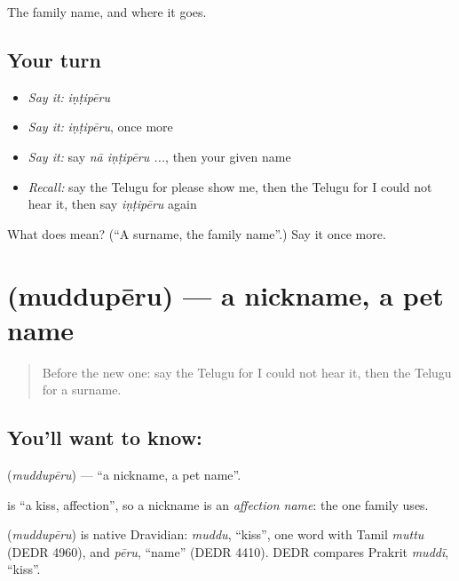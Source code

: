 \begin{grammarlens}[title={What you've built}]
The family name, and where it goes.
\end{grammarlens}

\subsection*{Your turn}
\begin{itemize}
\raggedright
  \item \emph{Say it:} \emph{iṇṭipēru}
  \item \emph{Say it:} \emph{iṇṭipēru}, once more
  \item \emph{Say it:} say \emph{nā iṇṭipēru ...}, then your given name
  \item \emph{Recall:} say the Telugu for please show me, then the Telugu for I could not hear it, then say \emph{iṇṭipēru} again
\end{itemize}

\begin{tcolorbox}[breakable,colback=teal!4,colframe=teal!35!black,title={Before you move on}]
What does  mean? (\textquotedblleft{}A surname, the family name\textquotedblright{}.) Say it once more.
\end{tcolorbox}
\section[\texorpdfstring{\te{ముద్దుపేరు} (muddupēru)}{ముద్దుపేరు (muddupēru)}]{ (muddupēru) — a nickname, a pet name}

\label{lesson:TE-C96-nickname}



\begin{quote}
Before the new one: say the Telugu for I could not hear it, then the Telugu for a surname.
\end{quote}

\subsection*{You'll want to know: }
\textbf{} (\emph{muddupēru}) — \textquotedblleft{}a nickname, a pet name\textquotedblright{}.

\textbf{} is \textquotedblleft{}a kiss, affection\textquotedblright{}, so a nickname is an \emph{affection name}: the one family uses.

\begin{cousinweb}
\textbf{} (\emph{muddupēru}) is native Dravidian: \emph{muddu}, \textquotedblleft{}kiss\textquotedblright{}, one word with Tamil \emph{muttu} (DEDR 4960), and \emph{pēru}, \textquotedblleft{}name\textquotedblright{} (DEDR 4410). DEDR compares Prakrit \emph{muddī}, \textquotedblleft{}kiss\textquotedblright{}.
\end{cousinweb}

